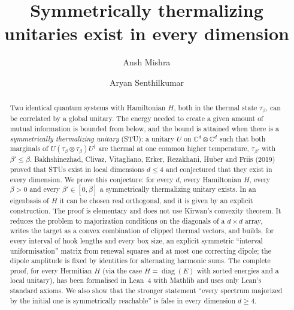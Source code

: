 \documentclass[11pt]{amsart}
\theoremstyle{definition}
\theoremstyle{remark}
\numberwithin{equation}{section}
\newcommand{\C}{\mathbb{C}}
\newcommand{\diag}{\operatorname{diag}}
\begin{document}
\title[Symmetrically thermalizing unitaries]{Symmetrically thermalizing unitaries exist in every dimension}

\author{Ansh Mishra}
\author{Aryan Senthilkumar}


\begin{abstract}
Two identical quantum systems with Hamiltonian $H$, both in the thermal state $\tau_\beta$, can be
correlated by a global unitary. The energy needed to create a given amount of mutual information is
bounded from below, and the bound is attained when there is a \emph{symmetrically thermalizing
unitary} (STU): a unitary $U$ on $\C^d\otimes\C^d$ such that both marginals of
$U(\tau_\beta\otimes\tau_\beta)U^\dagger$ are thermal at one common higher temperature,
$\tau_{\beta'}$ with $\beta'\le\beta$. Bakhshinezhad, Clivaz, Vitagliano, Erker, Rezakhani, Huber and
Friis (2019) proved that STUs exist in local dimensions $d\le 4$ and conjectured that they exist in
every dimension. We prove this conjecture: for every $d$, every Hamiltonian $H$, every $\beta>0$ and
every $\beta'\in[0,\beta]$ a symmetrically thermalizing unitary exists. In an eigenbasis of $H$ it can
be chosen real orthogonal, and it is given by an explicit construction. The proof is elementary and
does not use Kirwan's convexity theorem. It reduces the problem to majorization conditions on the
diagonals of a $d\times d$ array, writes the target as a convex combination of clipped thermal
vectors, and builds, for every interval of hook lengths and every box size, an explicit symmetric
``interval uniformisation'' matrix from renewal squares and at most one correcting dipole; the
dipole amplitude is fixed by identities for alternating harmonic sums. The complete proof, for
every Hermitian $H$ (via the case $H=\diag(E)$ with sorted energies and a local unitary), has been
formalised in Lean~4 with Mathlib and uses only Lean's standard axioms. We also show that the
stronger statement ``every spectrum majorized by the initial one is symmetrically reachable'' is
false in every dimension $d\ge 4$.
\end{abstract}

\maketitle

\tableofcontents
\end{document}
